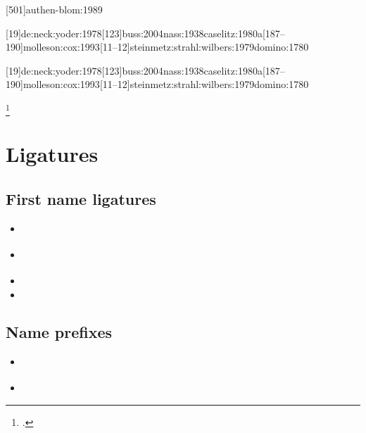 \documentclass[a4paper,12pt]{scrartcl}
\newcommand*{\Befehl}[1]{\texttt{\textbackslash#1}}
\begin{document}
\begin{enumerate}
        {}%
        {\item[\Befehl{sfcite}] }
        {}%
        {\item[\Befehl{sfcites}] [501]{authen-blom:1989}}
        {}%
        {\item[\Befehl{posscite}] }
        {}%
        {\item[\Befehl{posscites}] [19]{de:neck:yoder:1978}[123]{buss:2004}{nass:1938}{caselitz:1980a}[187--190]{molleson:cox:1993}[11--12]{steinmetz:strahl:wilbers:1979}{domino:1780}}
        {}%
        {\item[\Befehl{Posscite}] }
        {}%
        {\item[\Befehl{Posscites}] [19]{de:neck:yoder:1978}[123]{buss:2004}{nass:1938}{caselitz:1980a}[187--190]{molleson:cox:1993}[11--12]{steinmetz:strahl:wilbers:1979}{domino:1780}}
        {}%
    \item[\Befehl{footcite}] \footcites{auler:hiller:2015}{harsdoerffer:1656}
\end{enumerate}


\section{Ligatures}

\subsection{First name ligatures}
\begin{itemize}
    \item\cite{test::firstnames::2}%
    \item\cite{test::firstnames::1}%
    \item{}%
    \item{}%
\end{itemize}

\subsection{Name prefixes}
\begin{itemize}
    \item\cite{test::prefixnames::1}%
    \item{}%
\end{itemize}
\end{document}
